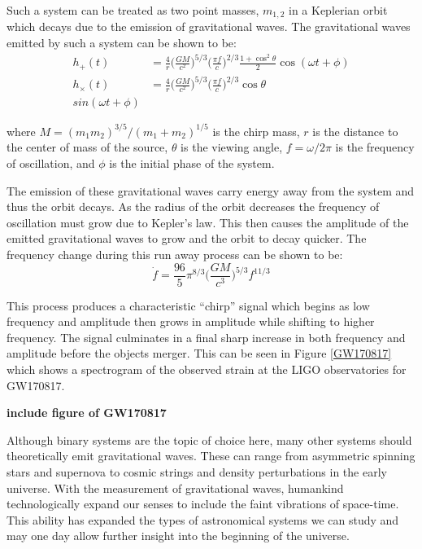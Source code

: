 \documentclass [12pt, proquest]{uwthesis}[2019]
\begin{document}
Such a system can be treated as two point masses, $m_{1,2}$ in a Keplerian orbit which decays due to the emission of gravitational waves. The gravitational waves emitted by such a system can be shown to be:
\begin{align}
h_+(t)&=\frac{4}{r}\bigg(\frac{GM}{c^2}\bigg)^{5/3} \bigg( \frac{\pi f}{c} \bigg)^{2/3} \frac{1+\cos^2\theta}{2} \cos(\omega t + \phi)\\
h_\times(t)&=\frac{4}{r}\bigg(\frac{GM}{c^2}\bigg)^{5/3} \bigg( \frac{\pi f}{c} \bigg)^{2/3} \cos\theta \\sin(\omega t + \phi)
\end{align}

where $M=(m_1 m_2)^{3/5}/(m_1+m_2)^{1/5}$ is the chirp mass, $r$ is the distance to the center of mass of the source, $\theta$ is the viewing angle, $f=\omega/2\pi$ is the frequency of oscillation, and $\phi$ is the initial phase of the system.

The emission of these gravitational waves carry energy away from the system and thus the orbit decays. As the radius of the orbit decreases the frequency of oscillation must grow due to Kepler's law. This then causes the amplitude of the emitted gravitational waves to grow and the orbit to decay quicker. The frequency change during this run away process can be shown to be:
\begin{equation}
\dot{f}=\frac{96}{5}\pi^{8/3}\bigg(\frac{G M}{c^3}\bigg)^{5/3} f^{11/3}
\end{equation}

This process produces a characteristic ``chirp'' signal which begins as low frequency and amplitude then grows in amplitude while shifting to higher frequency. The signal culminates in a final sharp increase in both frequency and amplitude before the objects merger. This can be seen in Figure \ref{GW170817} which shows a spectrogram of the observed strain at the LIGO observatories for GW170817.
 
 \textbf{include figure of GW170817}
 
 Although binary systems are the topic of choice here, many other systems should theoretically emit gravitational waves. These can range from asymmetric spinning stars and supernova to cosmic strings and density perturbations in the early universe. With the measurement of gravitational waves, humankind technologically expand our senses to include the faint vibrations of space-time. This ability has expanded the types of astronomical systems we can study and may one day allow further insight into the beginning of the universe.
\end{document}

